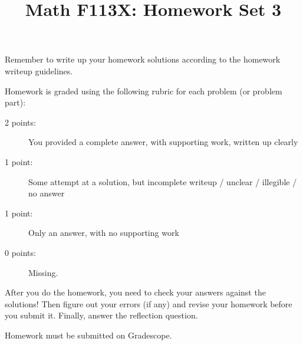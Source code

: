 \documentclass[11pt, oneside]{article}   	%
\title{Math F113X: Homework Set 3}
\date{}							%
\begin{document}
\maketitle



Remember to write up your homework solutions according to the homework writeup guidelines. 

Homework is graded using the following rubric for each problem (or problem part):

\begin{description}
\item[2 points:] You provided a complete answer, with supporting work, written up clearly
\item[1 point:] Some attempt at a solution, but incomplete writeup / unclear / illegible / no answer
\item[1 point:] Only an answer, with no supporting work 
\item[0 points:] Missing.
\end{description}

After you do the homework, you need to check your answers against the solutions! Then figure out your errors (if any) and revise your homework before you submit it. Finally, answer the reflection question.

Homework must be submitted on Gradescope.
\end{document}
